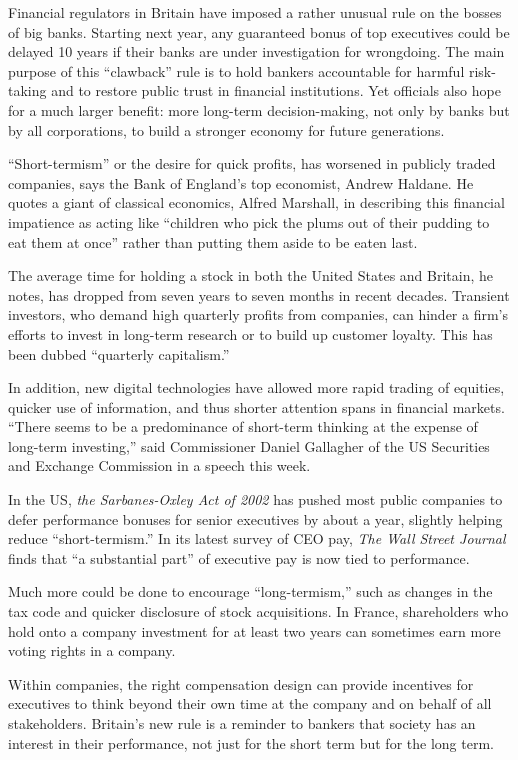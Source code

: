 \documentclass[UTF8,11pt]{ctexart}
\begin{document}
Financial regulators in Britain have imposed a rather unusual rule on the bosses of big banks. Starting next year, any guaranteed bonus of top executives could be delayed 10 years if their banks are under investigation for wrongdoing. The main purpose of this “clawback” rule is to hold bankers accountable for harmful risk-taking and to restore public trust in financial institutions. Yet officials also hope for a much larger benefit: more long-term decision-making, not only by banks but by all corporations, to build a stronger economy for future generations.


“Short-termism” or the desire for quick profits, has worsened in publicly traded companies, says the Bank of England’s top economist, Andrew Haldane. He quotes a giant of classical economics, Alfred Marshall, in describing this financial impatience as acting like “children who pick the plums out of their pudding to eat them at once” rather than putting them aside to be eaten last.


The average time for holding a stock in both the United States and Britain, he notes, has dropped from seven years to seven months in recent decades. Transient investors, who demand high quarterly profits from companies, can hinder a firm’s efforts to invest in long-term research or to build up customer loyalty. This has been dubbed “quarterly capitalism.”


In addition, new digital technologies have allowed more rapid trading of equities, quicker use of information, and thus shorter attention spans in financial markets. “There seems to be a predominance of short-term thinking at the expense of long-term investing,” said Commissioner Daniel Gallagher of the US Securities and Exchange Commission in a speech this week.


In the US, \textit{the Sarbanes-Oxley Act of 2002} has pushed most public companies to defer performance bonuses for senior executives by about a year, slightly helping reduce “short-termism.” In its latest survey of CEO pay, \textit{The Wall Street Journal }finds that “a substantial part” of executive pay is now tied to performance.


Much more could be done to encourage “long-termism,” such as changes in the tax code and quicker disclosure of stock acquisitions. In France, shareholders who hold onto a company investment for at least two years can sometimes earn more voting rights in a company.


Within companies, the right compensation design can provide incentives for executives to think beyond their own time at the company and on behalf of all stakeholders. Britain’s new rule is a reminder to bankers that society has an interest in their performance, not just for the short term but for the long term.
\end{document}
